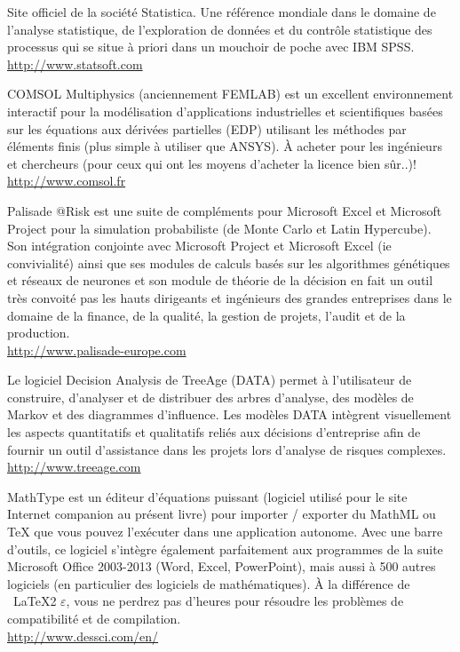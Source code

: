 	{\Large {}}{\Large {}}{\Large {}} Site officiel de la société Statistica. Une référence mondiale dans le domaine de l'analyse statistique, de l'exploration de données et du contrôle statistique des processus qui se situe à priori dans un mouchoir de poche avec IBM SPSS.\\
	\href{http://www.statsoft.com}{\color{blue}http://www.statsoft.com}
	
	{\Large {}}{\Large {}}{\Large {}}{\Large {}} COMSOL Multiphysics (anciennement FEMLAB) est un excellent environnement interactif pour la modélisation d'applications industrielles et scientifiques basées sur les équations aux dérivées partielles (EDP) utilisant les méthodes par éléments finis (plus simple à utiliser que ANSYS). À acheter pour les ingénieurs et chercheurs (pour ceux qui ont les moyens d'acheter la licence bien sûr..)!\\
	\href{http://www.comsol.fr}{\color{blue}http://www.comsol.fr}
	
	{\Large {}}{\Large {}}{\Large {}}{\Large {}} Palisade @Risk est une suite de compléments pour Microsoft Excel et Microsoft Project pour la simulation probabiliste (de Monte Carlo et Latin Hypercube). Son intégration conjointe avec Microsoft Project et Microsoft Excel (ie convivialité) ainsi que ses modules de calculs basés sur les algorithmes génétiques et réseaux de neurones et son module de théorie de la décision en fait un outil très convoité pas les hauts dirigeants et ingénieurs des grandes entreprises dans le domaine de la finance, de la qualité, la gestion de projets, l'audit et de la production.\\
	\href{http://www.palisade-europe.com}{\color{blue}http://www.palisade-europe.com}
	
	{\Large {}}{\Large {}}{\Large {}}{\Large {}} Le logiciel Decision Analysis de TreeAge (DATA) permet à l'utilisateur de construire, d'analyser et de distribuer des arbres d'analyse, des modèles de Markov et des diagrammes d'influence. Les modèles DATA intègrent visuellement les aspects quantitatifs et qualitatifs reliés aux décisions d'entreprise afin de fournir un outil d'assistance dans les projets lors d'analyse de risques complexes.\\
	\href{http://www.treeage.com}{\color{blue}http://www.treeage.com}
	
	{\Large {}}{\Large {}}{\Large {}}{\Large {}} MathType est un éditeur d'équations puissant (logiciel utilisé pour le site Internet companion au présent livre) pour importer / exporter du MathML ou TeX que vous pouvez l'exécuter dans une application autonome. Avec une barre d'outils, ce logiciel s'intègre également parfaitement aux programmes de la suite Microsoft Office 2003-2013 (Word, Excel, PowerPoint), mais aussi à 500 autres logiciels (en particulier des logiciels de mathématiques). À la différence de \ \LaTeX 2 $\varepsilon$, vous ne perdrez pas d’heures pour résoudre les problèmes de compatibilité et de compilation.\\ 
	\href{http://www.dessci.com/en/}{\color{blue}http://www.dessci.com/en/}
	

